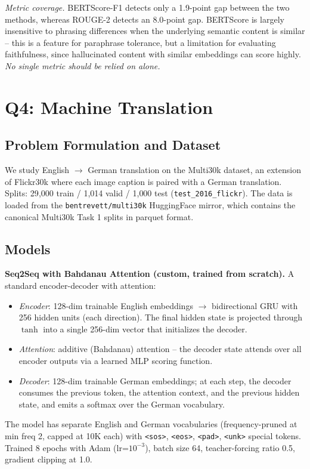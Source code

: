\documentclass[11pt,a4paper]{article}
\begin{document}
\textit{Metric coverage.} BERTScore-F1 detects only a 1.9-point gap between the two methods, whereas ROUGE-2 detects an 8.0-point gap. BERTScore is largely insensitive to phrasing differences when the underlying semantic content is similar -- this is a feature for paraphrase tolerance, but a limitation for evaluating faithfulness, since hallucinated content with similar embeddings can score highly. \emph{No single metric should be relied on alone.}

\section{Q4: Machine Translation}

\subsection{Problem Formulation and Dataset}

We study English $\to$ German translation on the Multi30k dataset, an extension of Flickr30k where each image caption is paired with a German translation. Splits: 29{,}000 train / 1{,}014 valid / 1{,}000 test (\texttt{test\_2016\_flickr}). The data is loaded from the \texttt{bentrevett/multi30k} HuggingFace mirror, which contains the canonical Multi30k Task 1 splits in parquet format.

\subsection{Models}

\textbf{Seq2Seq with Bahdanau Attention (custom, trained from scratch).} A standard encoder-decoder with attention:
\vspace{-0.3em}
\begin{itemize}[noitemsep,leftmargin=1.4em]
    \item \emph{Encoder}: 128-dim trainable English embeddings $\to$ bidirectional GRU with 256 hidden units (each direction). The final hidden state is projected through $\tanh$ into a single 256-dim vector that initializes the decoder.
    \item \emph{Attention}: additive (Bahdanau) attention -- the decoder state attends over all encoder outputs via a learned MLP scoring function.
    \item \emph{Decoder}: 128-dim trainable German embeddings; at each step, the decoder consumes the previous token, the attention context, and the previous hidden state, and emits a softmax over the German vocabulary.
\end{itemize}
\vspace{-0.3em}
The model has separate English and German vocabularies (frequency-pruned at min freq 2, capped at 10K each) with \texttt{<sos>}, \texttt{<eos>}, \texttt{<pad>}, \texttt{<unk>} special tokens. Trained 8 epochs with Adam (lr=$10^{-3}$), batch size 64, teacher-forcing ratio 0.5, gradient clipping at 1.0.
\end{document}
